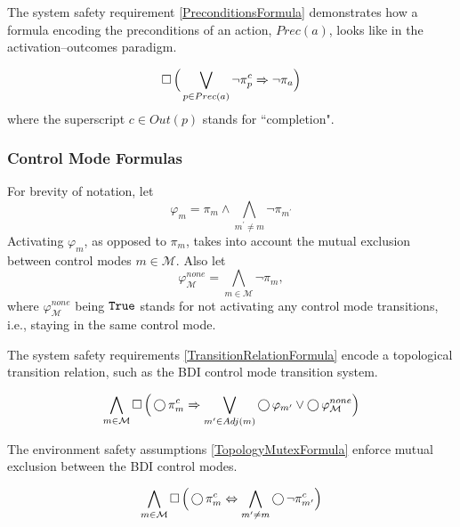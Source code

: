 The system safety requirement \eqref{PreconditionsFormula} demonstrates how a formula encoding the preconditions of an action, $Prec(a)$, looks like in the activation--outcomes paradigm.

\begin{equation}\label{PreconditionsFormula}
	\operatorname{\Box} \Big( \bigvee \limits_{p \in Prec(a)} \lnot \pi_p^c \Rightarrow \lnot \pi_a \Big)
\end{equation}
where the superscript $c \in Out(p)$ stands for ``completion".


\subsubsection{Control Mode Formulas}

For brevity of notation, let $$\varphi_m = \pi_m \wedge \bigwedge_{m^\prime \neq m} \lnot \pi_{m^\prime}$$
Activating $\varphi_m$, as opposed to $\pi_m$, takes into account the mutual exclusion between control modes $m \in \mathcal{M}$.
Also let $$\varphi_\mathcal{M}^{none} = \bigwedge_{m \in \mathcal{M}} \lnot \pi_m,$$
where $\varphi_\mathcal{M}^{none}$ being $\mathtt{True}$ stands for not activating any control mode transitions, i.e., staying in the same control mode.

The system safety requirements \eqref{TransitionRelationFormula} encode a topological transition relation, such as the BDI control mode transition system.

\begin{equation}\label{TransitionRelationFormula}
	\bigwedge \limits_{m \in \mathcal{M}} \operatorname{\Box} \Big( \operatorname{\bigcirc} \pi_m^c \Rightarrow \bigvee \limits_{m^\prime \in Adj(m)} \operatorname{\bigcirc} \varphi_{m^\prime} \vee \operatorname{\bigcirc} \varphi_\mathcal{M}^{none} \Big)
\end{equation}

The environment safety assumptions \eqref{TopologyMutexFormula} enforce mutual exclusion between the BDI control modes.

\begin{equation}\label{TopologyMutexFormula}
	\bigwedge \limits_{m \in \mathcal{M}} \operatorname{\Box} \Big( \operatorname{\bigcirc} \pi_m^c \Leftrightarrow \bigwedge \limits_{m^\prime \neq m} \operatorname{\bigcirc} \lnot \pi_{m^\prime}^c \Big)
\end{equation}

